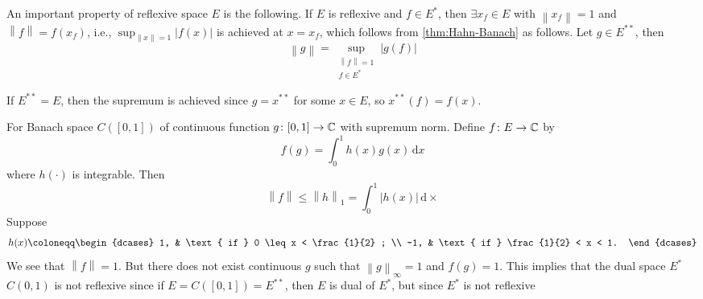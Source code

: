 \begin{remark}
	An important property of reflexive space \(E\) is the following. If \(E\) is reflexive and \(f\in E^{\ast} \), then \(\exists x_f\in E\) with \(\left\lVert x_f\right\rVert = 1\) and \(\left\lVert f\right\rVert = f(x_f)\), i.e., \(\sup _{\left\lVert x\right\rVert = 1} \left\vert f(x) \right\vert \) is achieved at \(x = x_f\), which follows from \autoref{thm:Hahn-Banach} as follows. Let \(g\in E^{\ast\ast} \), then
	\[
		\left\lVert g\right\rVert = \sup _{\substack{\left\lVert f\right\rVert = 1\\ f\in E^{\ast} }}\left\vert g(f) \right\vert
	\]

	If \(E^{\ast\ast} = E\), then the supremum is achieved since \(g = x^{\ast\ast} \) for some \(x\in E\), so \(x^{\ast\ast} (f) = f(x)\).
\end{remark}

\begin{eg}
	For Banach space \(C([0, 1])\) of continuous function \(g\colon [0, 1]\to \mathbb{\MakeUppercase{c}} \) with supremum norm. Define \(f\colon E\to \mathbb{\MakeUppercase{c}} \) by
	\[
		f(g) = \int _0^1 h(x)g(x)\,\mathrm{d} x
	\]
	where \(h(\cdot)\) is integrable. Then
	\[
		\left\lVert f\right\rVert \leq \left\lVert h\right\rVert _1 = \int _0^1 \left\vert h(x) \right\vert \,\mathrm{d} \times
	\]
	Suppose
	\[
		h(x) \coloneqq \begin{dcases}
			1,  & \text{ if } 0 \leq x < \frac{1}{2} ; \\
			-1, & \text{ if } \frac{1}{2} < x < 1.
		\end{dcases}
	\]
	We see that \(\left\lVert f\right\rVert = 1\). But there does not exist continuous \(g\) such that \(\left\lVert g\right\rVert _\infty = 1\) and \(f(g) = 1\). This implies that the dual space \(E^{\ast} \)  \(C(0, 1)\) is not reflexive since if \(E = C([0, 1]) = E^{\ast\ast} \), then \(E\) is dual of \(E^{\ast} \), but since \(E^{\ast}\) is not reflexive
\end{eg}